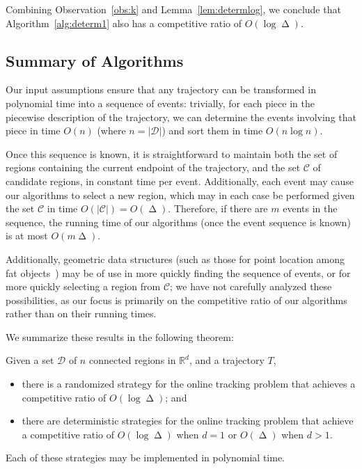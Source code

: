 \documentclass[runningheads]{llncs}
\newcommand {\mathset} [1] {\ensuremath {\mathbb {#1}}}
\newcommand {\R} {\mathset {R}}
\newcommand {\script} [1] {\ensuremath {\mathcal {#1}}}
\DeclareMathOperator {\ply}{\Delta}
\begin{document}
      Combining Observation~\ref {obs:k} and Lemma~\ref {lem:determlog}, we conclude that Algorithm~\ref {alg:determ1} also has a competitive ratio of $O (\log \ply)$.

    \subsection {Summary of Algorithms} \label {sec:runtime}
Our input assumptions ensure that any trajectory can be transformed in polynomial time into a sequence of events: trivially, for each piece in the piecewise description of the trajectory, we can determine the events involving that piece in time $O(n)$ (where $n=|\script D|$) and sort them in time $O(n\log n)$.

Once this sequence is known, it is straightforward to maintain both the set of regions containing the current endpoint of the trajectory, and the set $\script C$ of candidate regions, in constant time per event. Additionally, each event may cause our algorithms to select a new region, which may in each case be performed given the set $\script C$ in time $O(|\script C|)=O(\ply)$. Therefore, if there are $m$ events in the sequence, the running time of our algorithms (once the event sequence is known) is at most $O(m\ply)$.

Additionally, geometric data structures (such as those for point location among fat objects~\cite {os-rsplfo-96}) may be of use in more quickly  finding the sequence of events, or for more quickly selecting a region from $\script C$; we have not carefully analyzed these possibilities, as our focus is primarily on the competitive ratio of our algorithms rather than on their running times.

We summarize these results in the following theorem:

      \begin {theorem}
        Given a set $\script D$ of $n$ connected regions in $\R^d$, and a trajectory $T$,
        \begin {itemize}
          \item there is a randomized strategy for the online tracking problem that achieves a competitive ratio of $O (\log \ply)$; and
          \item there are deterministic strategies for  the online tracking problem that achieve a competitive ratio of $O (\log \ply)$ when $d = 1$ or $O (\ply)$ when $d > 1$.
        \end {itemize}
        Each of these strategies may be implemented in polynomial time.
      \end {theorem}
      
\end{document}
